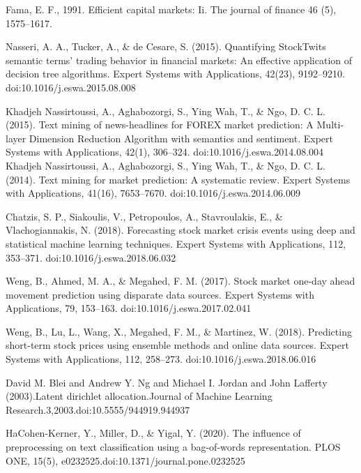 \documentclass[preprint,12pt]{elsarticle}
\begin{document}
\medskip
\pagebreak

\begin{thebibliography}{9}

Fama, E. F., 1991. Efficient capital markets: Ii. The journal of finance 46 (5), 1575–1617.



Nasseri, A. A., Tucker, A., \& de Cesare, S. (2015). Quantifying StockTwits semantic terms’ trading behavior in financial markets: An effective application of decision tree algorithms. Expert Systems with Applications, 42(23), 9192–9210. doi:10.1016/j.eswa.2015.08.008 


Khadjeh Nassirtoussi, A., Aghabozorgi, S., Ying Wah, T., \& Ngo, D. C. L. (2015). Text mining of news-headlines for FOREX market prediction: A Multi-layer Dimension Reduction Algorithm with semantics and sentiment. Expert Systems with Applications, 42(1), 306–324. doi:10.1016/j.eswa.2014.08.004 
Khadjeh Nassirtoussi, A., Aghabozorgi, S., Ying Wah, T., \& Ngo, D. C. L. (2014). Text mining for market prediction: A systematic review. Expert Systems with Applications, 41(16), 7653–7670. doi:10.1016/j.eswa.2014.06.009 


Chatzis, S. P., Siakoulis, V., Petropoulos, A., Stavroulakis, E., \& Vlachogiannakis, N. (2018). Forecasting stock market crisis events using deep and statistical machine learning techniques. Expert Systems with Applications, 112, 353–371. doi:10.1016/j.eswa.2018.06.032 


Weng, B., Ahmed, M. A., \& Megahed, F. M. (2017). Stock market one-day ahead movement prediction using disparate data sources. Expert Systems with Applications, 79, 153–163. doi:10.1016/j.eswa.2017.02.041 



Weng, B., Lu, L., Wang, X., Megahed, F. M., \& Martinez, W. (2018). Predicting short-term stock prices using ensemble methods and online data sources. Expert Systems with Applications, 112, 258–273. doi:10.1016/j.eswa.2018.06.016 




David M. Blei and Andrew Y. Ng and Michael I. Jordan and John Lafferty (2003).Latent dirichlet allocation.Journal of Machine Learning Research.3,2003.doi:10.5555/944919.944937


HaCohen-Kerner, Y., Miller, D., \& Yigal, Y. (2020). The influence of preprocessing on text classification using a bag-of-words representation. PLOS ONE, 15(5), e0232525.doi:10.1371/journal.pone.0232525 


\end{thebibliography}
\end{document}
